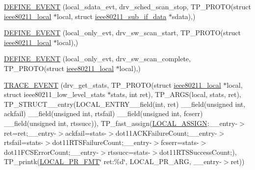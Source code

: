 \begin{DoxyCompactItemize}
\item 
\hyperlink{driver-trace_8h_a6a57e9a64a0d01342ec91f9ba70e06de}{D\-E\-F\-I\-N\-E\-\_\-\-E\-V\-E\-N\-T} (local\-\_\-sdata\-\_\-evt, drv\-\_\-sched\-\_\-scan\-\_\-stop, T\-P\-\_\-\-P\-R\-O\-T\-O(struct \hyperlink{structieee80211__local}{ieee80211\-\_\-local} $\ast$local, struct \hyperlink{structieee80211__sub__if__data}{ieee80211\-\_\-sub\-\_\-if\-\_\-data} $\ast$sdata),)
\item 
\hyperlink{driver-trace_8h_a3b885b33c68e022f28d09c2527806623}{D\-E\-F\-I\-N\-E\-\_\-\-E\-V\-E\-N\-T} (local\-\_\-only\-\_\-evt, drv\-\_\-sw\-\_\-scan\-\_\-start, T\-P\-\_\-\-P\-R\-O\-T\-O(struct \hyperlink{structieee80211__local}{ieee80211\-\_\-local} $\ast$local),)
\item 
\hyperlink{driver-trace_8h_a5c73a444bf78891327e7ae8bb23d1db8}{D\-E\-F\-I\-N\-E\-\_\-\-E\-V\-E\-N\-T} (local\-\_\-only\-\_\-evt, drv\-\_\-sw\-\_\-scan\-\_\-complete, T\-P\-\_\-\-P\-R\-O\-T\-O(struct \hyperlink{structieee80211__local}{ieee80211\-\_\-local} $\ast$local),)
\item 
\hyperlink{driver-trace_8h_a83aec7e1c4c25ae4e838d2d859391975}{T\-R\-A\-C\-E\-\_\-\-E\-V\-E\-N\-T} (drv\-\_\-get\-\_\-stats, T\-P\-\_\-\-P\-R\-O\-T\-O(struct \hyperlink{structieee80211__local}{ieee80211\-\_\-local} $\ast$local, struct ieee80211\-\_\-low\-\_\-level\-\_\-stats $\ast$stats, int ret), T\-P\-\_\-\-A\-R\-G\-S(local, stats, ret), T\-P\-\_\-\-S\-T\-R\-U\-C\-T\-\_\-\-\_\-entry(L\-O\-C\-A\-L\-\_\-\-E\-N\-T\-R\-Y\-\_\-\-\_\-field(int, ret) \-\_\-\-\_\-field(unsigned int, ackfail) \-\_\-\-\_\-field(unsigned int, rtsfail) \-\_\-\-\_\-field(unsigned int, fcserr) \-\_\-\-\_\-field(unsigned int, rtssucc)), T\-P\-\_\-fast\-\_\-assign(\hyperlink{driver-trace_8h_ab19d9141887ea92ef9640df06a51e0a1}{L\-O\-C\-A\-L\-\_\-\-A\-S\-S\-I\-G\-N};\-\_\-\-\_\-entry-\/$>$ret=ret;\-\_\-\-\_\-entry-\/$>$ackfail=stats-\/$>$dot11\-A\-C\-K\-Failure\-Count;\-\_\-\-\_\-entry-\/$>$rtsfail=stats-\/$>$dot11\-R\-T\-S\-Failure\-Count;\-\_\-\-\_\-entry-\/$>$fcserr=stats-\/$>$dot11\-F\-C\-S\-Error\-Count;\-\_\-\-\_\-entry-\/$>$rtssucc=stats-\/$>$dot11\-R\-T\-S\-Success\-Count;), T\-P\-\_\-printk(\hyperlink{driver-trace_8h_a09833af423135e21ffe99a59ae088cf1}{L\-O\-C\-A\-L\-\_\-\-P\-R\-\_\-\-F\-M\-T}\char`\"{} ret\-:\%d\char`\"{}, L\-O\-C\-A\-L\-\_\-\-P\-R\-\_\-\-A\-R\-G, \-\_\-\-\_\-entry-\/$>$ret))
\item 

\end{DoxyCompactItemize}
